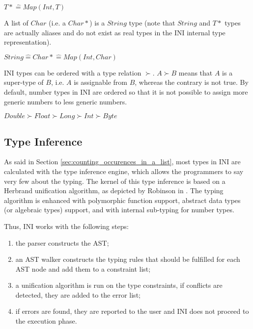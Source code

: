 \documentclass[11pt]{article}
\begin{document}
\begin{center}
$T* \widehat= Map(Int,T)$
\end{center}

A list of $Char$ (i.e. a $Char*$) is a $String$ type (note that $String$ and $T*$ types are actually aliases and do not exist as real types in the INI internal type representation).

\begin{center}
$String \widehat= Char* \widehat= Map(Int,Char)$
\end{center}

INI types can be ordered with a type relation $\succ$. $A \succ B$ means that $A$ is a super-type of $B$, i.e. $A$ is assignable from $B$, whereas the contrary is not true. By default, number types in INI are ordered so that it is not possible to assign more generic numbers to less generic numbers.

\begin{center}
$Double \succ Float \succ Long \succ Int \succ Byte$
\end{center}

\subsection{Type Inference}

As said in Section \ref{sec:counting_occurences_in_a_list}, most types in INI are calculated with the type inference engine, which allows the programmers to say very few about the typing. The kernel of this type inference is based on a Herbrand unification algorithm, as depicted by Robinson in \cite{robinson1965}. The typing algorithm is enhanced with polymorphic function support, abstract data types (or algebraic types) support, and with internal sub-typing for number types.

Thus, INI works with the following steps:

\begin{enumerate}
\item the parser constructs the AST;
\item an AST walker constructs the typing rules that should be fulfilled for each AST node and add them to a constraint list;
\item a unification algorithm is run on the type constraints, if conflicts are detected, they are added to the error list;
\item if errors are found, they are reported to the user and INI does not proceed to the execution phase.
\end{enumerate}
\end{document}
